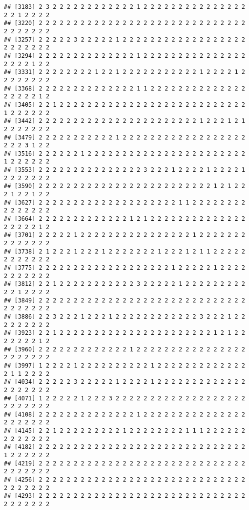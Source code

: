 \documentclass[
]{article}
\begin{document}
\begin{verbatim}
## [3183] 2 3 2 2 2 2 2 2 2 2 2 2 2 2 1 2 2 2 2 2 2 2 2 2 2 2 2 2 2 2 2 2 1 2 2 2 2
## [3220] 2 2 2 2 2 2 2 2 2 2 2 2 2 2 2 2 2 2 2 2 2 2 2 2 2 2 2 2 2 2 2 2 2 2 2 2 2
## [3257] 2 2 2 2 2 3 2 2 2 2 2 1 2 2 2 2 2 2 2 2 2 2 2 2 2 2 2 2 2 2 2 2 2 2 2 2 2
## [3294] 2 2 2 2 2 2 2 2 2 2 2 2 2 2 1 2 2 2 2 2 2 2 2 2 2 2 2 2 2 2 2 2 2 2 1 2 2
## [3331] 2 2 2 2 2 2 2 2 1 2 2 1 2 2 2 2 2 2 2 2 2 2 2 1 2 2 2 2 1 2 2 2 2 2 2 2 2
## [3368] 2 2 2 2 2 2 2 2 2 2 2 2 2 2 1 1 2 2 2 2 2 2 2 2 2 2 2 2 2 2 2 2 2 2 2 1 2
## [3405] 2 2 1 2 2 2 2 2 2 2 2 2 2 2 2 2 2 2 2 2 2 2 2 2 2 2 2 2 2 2 1 2 2 2 2 2 2
## [3442] 2 2 2 2 2 2 2 2 2 2 2 2 2 2 2 2 2 2 2 2 2 2 2 1 2 2 2 1 2 1 2 2 2 2 2 2 2
## [3479] 2 2 2 2 2 2 2 2 2 2 2 1 2 2 2 2 2 2 2 2 2 2 2 2 2 2 2 2 2 2 2 2 2 3 1 2 2
## [3516] 2 2 2 2 2 2 1 2 2 2 2 2 2 2 2 2 2 2 2 2 2 2 2 2 2 2 2 2 2 2 1 2 2 2 2 2 2
## [3553] 2 2 2 2 2 2 2 2 2 2 2 2 2 2 2 3 2 2 2 1 2 2 2 2 1 2 2 2 2 1 2 2 2 2 2 2 2
## [3590] 2 2 2 2 2 2 2 2 2 2 2 2 2 2 2 2 2 2 2 2 2 2 2 2 2 1 2 1 2 2 2 1 2 2 1 2 2
## [3627] 2 2 2 2 2 2 2 2 2 2 2 2 2 2 2 2 2 2 2 2 1 1 2 2 2 2 2 2 2 2 2 2 2 2 2 2 2
## [3664] 2 2 2 2 2 2 2 2 2 2 2 2 2 1 2 1 2 2 2 2 2 2 2 2 2 2 2 2 2 2 2 2 2 2 2 1 2
## [3701] 2 2 2 2 2 1 2 2 2 2 2 2 2 2 2 2 2 2 2 2 2 2 1 2 2 2 2 2 2 2 2 2 2 2 2 2 2
## [3738] 2 1 2 2 2 1 2 2 2 1 2 2 2 2 2 2 2 1 2 2 2 1 2 1 1 2 2 2 2 2 2 2 2 2 2 2 2
## [3775] 2 2 2 2 2 2 2 2 2 2 2 2 2 2 2 2 2 2 2 1 2 2 2 2 2 1 2 2 2 2 2 2 2 2 2 2 2
## [3812] 2 2 1 2 2 2 2 2 2 2 2 2 2 2 3 2 2 2 2 2 1 2 2 2 2 2 2 2 2 2 2 2 1 2 2 2 2
## [3849] 2 2 2 2 2 2 2 2 2 2 2 2 2 2 2 2 2 2 2 2 2 2 2 2 2 2 2 2 2 2 2 2 2 2 2 2 2
## [3886] 2 2 3 2 2 2 1 2 2 2 1 2 2 2 2 2 2 2 2 2 2 2 2 3 2 2 2 1 2 2 2 2 2 2 2 2 2
## [3923] 2 2 1 2 2 2 2 2 2 2 2 2 2 2 2 2 2 2 2 2 2 2 2 2 2 1 2 1 2 2 2 2 2 2 2 1 2
## [3960] 2 2 2 2 2 2 2 2 2 2 2 2 2 1 2 2 2 2 2 2 2 2 2 2 2 2 2 2 2 2 2 2 2 2 2 2 2
## [3997] 1 2 2 2 2 1 2 2 2 2 2 2 2 2 2 2 1 2 2 2 2 2 2 2 2 2 2 2 2 2 2 1 1 2 2 2 2
## [4034] 2 2 2 2 2 3 2 2 2 2 2 1 2 2 2 2 1 2 2 2 2 2 2 2 2 2 2 2 2 2 2 2 2 2 2 2 2
## [4071] 1 2 2 2 2 2 1 2 2 2 3 2 2 2 2 2 2 2 2 2 2 2 2 2 2 2 2 2 2 2 2 2 2 2 2 2 2
## [4108] 2 2 2 2 2 2 2 2 2 2 2 2 2 2 1 2 2 2 2 2 2 2 2 2 2 2 2 2 2 2 2 2 2 2 2 2 2
## [4145] 2 2 1 2 2 2 2 2 2 2 2 2 1 2 2 2 2 2 2 2 2 1 1 1 2 2 2 2 2 2 2 2 2 2 2 2 2
## [4182] 2 2 2 2 2 2 2 2 2 2 2 2 2 2 2 2 2 2 2 2 2 2 2 2 2 2 2 2 2 2 1 2 2 2 2 2 2
## [4219] 2 2 2 2 2 2 2 2 2 2 2 2 2 2 2 2 2 2 2 2 2 2 2 2 2 2 2 2 2 2 2 2 2 2 2 2 2
## [4256] 2 2 2 2 2 2 2 2 2 2 2 2 2 2 2 2 2 2 2 2 2 2 2 2 2 2 2 2 2 2 2 2 2 2 2 2 2
## [4293] 2 2 2 2 2 2 2 2 2 2 2 2 2 2 2 2 2 2 2 2 2 2 2 2 2 2 2 2 2 2 2 2 2 2 2 2 2

\end{verbatim}
\end{document}
